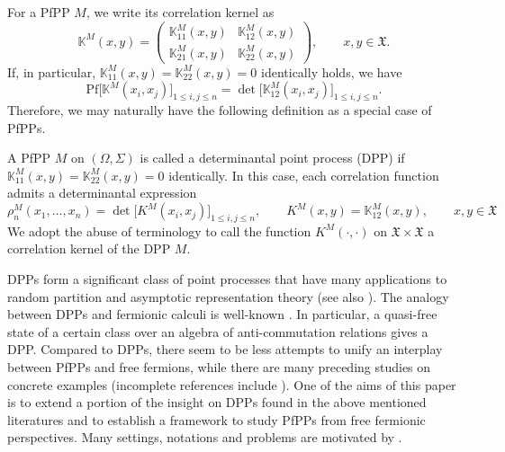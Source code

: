 \documentclass[pdftex]{sigma}
\numberwithin{equation}{section}
\newcommand{\mfrak}[1]{\mathfrak{#1}}
\newcommand{\mbb}[1]{\mathbb{#1}}
\newcommand{\mrm}[1]{\mathrm{#1}}
\begin{document}
For a PfPP $M$, we write its correlation kernel as
\begin{equation*}
	\mbb{K}^{M}(x,y)
	=\left(
	\begin{matrix}
		\mbb{K}_{11}^{M}(x,y) & \mbb{K}_{12}^{M}(x,y) \\
		\mbb{K}_{21}^{M}(x,y) & \mbb{K}_{22}^{M}(x,y)
	\end{matrix}
	\right),\qquad x,y\in\mfrak{X}.
\end{equation*}
If, in particular, $\mbb{K}_{11}^{M}(x,y)=\mbb{K}_{22}^{M}(x,y)=0$ identically holds, we have
\begin{equation*}
	\mrm{Pf}\big[\mbb{K}^{M}(x_{i},x_{j})\big]_{1\le i,j\le n}=\det \big[\mbb{K}_{12}^{M}(x_{i},x_{j})\big]_{1\le i,j\le n}.
\end{equation*}
Therefore, we may naturally have the following definition as a special case of PfPPs.

\begin{Definition}
A PfPP $M$ on $(\Omega,\Sigma)$ is called a determinantal point process (DPP) if $\mbb{K}^{M}_{11}(x,y)\allowbreak =\mbb{K}^{M}_{22}(x,y)=0$ identically.
In this case, each correlation function admits a determinantal expression
\begin{equation*}
	\rho_{n}^{M}(x_{1},\dots, x_{n})=\det \big[K^{M}(x_{i},x_{j})\big]_{1\le i,j\le n},\qquad K^{M}(x,y)=\mbb{K}^{M}_{12}(x,y),\qquad x,y\in\mfrak{X}
\end{equation*}
We adopt the abuse of terminology to call the function $K^{M}(\cdot,\cdot)$ on $\mfrak{X}\times\mfrak{X}$ a correlation kernel of the DPP $M$.
\end{Definition}

DPPs form a significant class of point processes that have many applications to random partition and asymptotic representation theory \cite{Borodin1998a, BorodinOlshanski1998a, Borodin1998b,BorodinOlshanski1998b,Okounkov2001,Olshanski1998, Olshanski2003} (see also \cite{Borodin2011,BenHoughKrishnapurPeresVirag2006, Lyons2003, Soshnikov2000}). The analogy between DPPs and fermionic calculi is well-known \cite{Lytvynov2002,LytvynovMei2007,Olshanski2020, ShiraiTakahashi2003a, ShiraiTakahashi2003b, Spohn1987}. In particular, a quasi-free state of a certain class over an algebra of anti-commutation relations gives a DPP.
Compared to DPPs, there seem to be less attempts to unify an interplay between PfPPs and free fermions, while there are many preceding studies on concrete examples (incomplete references include \cite{BorodinRains2005, Ferrari2004, KatoriTanemura2007,Matsumoto2005, MatsumotoShirai2013,Nagao2007,Rains2000,Vuletic2007,WangLi2019}).
One of the aims of this paper is to extend a portion of the insight on DPPs found in the above mentioned literatures and to establish a framework to study PfPPs from free fermionic perspectives. Many settings, notations and problems are motivated by \cite{Olshanski2020}.
\end{document}
